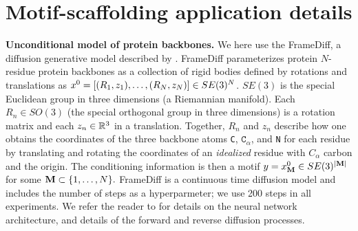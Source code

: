 \section{Motif-scaffolding application details}\label{sec:supp_results_protein}


\textbf{Unconditional model of protein backbones.}
We here use the FrameDiff, a diffusion generative model described by \citet{yim2023se}.
FrameDiff parameterizes protein $N$-residue protein backbones as a collection of rigid bodies defined by rotations and translations as $x^{0}=[(R_1, z_1), \dots, (R_N, z_N)]\in SE(3)^N$.
$SE(3)$ is the special Euclidean group in three dimensions (a Riemannian manifold). 
Each $R_n\in SO(3)$ (the special orthogonal group in three dimensions) is a rotation matrix and each $z_n\in \mathbb{R}^3$ in a translation.
Together, $R_n$ and $z_n$ describe how one obtains the coordinates of the three backbone atoms \texttt{C}, $\texttt{C}_\alpha$, and \texttt{N} for each residue by translating and rotating the coordinates of an \emph{idealized} residue with $C_\alpha$ carbon and the origin. 
The conditioning information is then a motif $y=x^{0}_{\mathbf{M}}\in SE(3)^{|\mathbf{M}|}$ for some $\mathbf{M}\subset \{1,\dots, N\}.$
FrameDiff is a continuous time diffusion model and includes the number of steps as a hyperparmeter; we use 200 steps in all experiments.
We refer the reader to \citep{yim2023se} for details on the neural network architecture,
and details of the forward and reverse diffusion processes.

